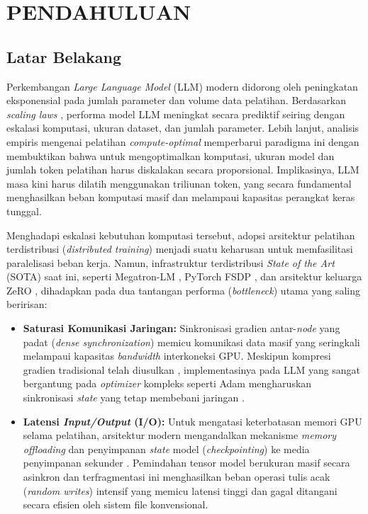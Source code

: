 \cleardoublepage
\chapter{PENDAHULUAN}
\label{chap:pendahuluan}

\section{Latar Belakang}

Perkembangan \textit{Large Language Model} (LLM) modern didorong oleh peningkatan eksponensial pada jumlah parameter dan volume data pelatihan.
Berdasarkan \textit{scaling laws} \cite{DBLP:journals/corr/abs-2001-08361}, performa model LLM meningkat secara prediktif seiring dengan eskalasi komputasi, ukuran dataset, dan jumlah parameter.
Lebih lanjut, analisis empiris mengenai pelatihan \textit{compute-optimal} \cite{NEURIPS2022_c1e2faff} memperbarui paradigma ini dengan membuktikan bahwa untuk mengoptimalkan komputasi, ukuran model dan jumlah token pelatihan harus diskalakan secara proporsional.
Implikasinya, LLM masa kini harus dilatih menggunakan triliunan token, yang secara fundamental menghasilkan beban komputasi masif dan melampaui kapasitas perangkat keras tunggal.

Menghadapi eskalasi kebutuhan komputasi tersebut, adopsi arsitektur pelatihan terdistribusi (\textit{distributed training}) menjadi suatu keharusan untuk memfasilitasi paralelisasi beban kerja.
Namun, infrastruktur terdistribusi \textit{State of the Art} (SOTA) saat ini, seperti Megatron-LM \cite{DBLP:journals/corr/abs-1909-08053}, PyTorch FSDP \cite{zhao2023fsdp}, dan arsitektur keluarga ZeRO \cite{DBLP:journals/corr/abs-2104-07857}, dihadapkan pada dua tantangan performa (\textit{bottleneck}) utama yang saling beririsan:

\begin{itemize}
    \item \textbf{Saturasi Komunikasi Jaringan:} Sinkronisasi gradien antar-\textit{node} yang padat (\textit{dense synchronization}) memicu komunikasi data masif yang seringkali melampaui kapasitas \textit{bandwidth} interkoneksi GPU. Meskipun kompresi gradien tradisional telah diusulkan \cite{DBLP:journals/corr/abs-1712-01887}, implementasinya pada LLM yang sangat bergantung pada \textit{optimizer} kompleks seperti Adam mengharuskan sinkronisasi \textit{state} yang tetap membebani jaringan \cite{DBLP:journals/corr/abs-2102-02888}.
    \item \textbf{Latensi \textit{Input/Output} (I/O):} Untuk mengatasi keterbatasan memori GPU selama pelatihan, arsitektur modern mengandalkan mekanisme \textit{memory offloading} dan penyimpanan \textit{state} model (\textit{checkpointing}) ke media penyimpanan sekunder \cite{DBLP:journals/corr/abs-2104-07857}. Pemindahan tensor model berukuran masif secara asinkron dan terfragmentasi ini menghasilkan beban operasi tulis acak (\textit{random writes}) intensif yang memicu latensi tinggi dan gagal ditangani secara efisien oleh sistem file konvensional.
\end{itemize}

